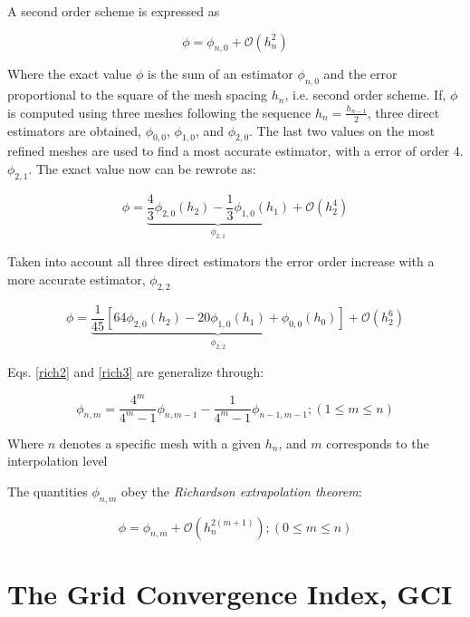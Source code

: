 A second order scheme is expressed as

\begin{equation}
    \phi=\phi_{n,0}+\mathcal{O}(h_n^2)
\end{equation}

Where the exact value $\phi$ is the sum of an estimator $\phi_{n,0}$ and the error proportional to the square of the mesh spacing $h_n$, i.e. second order scheme. If, $\phi$ is computed using three meshes following the sequence $h_n=\frac{h_{n-1}}{2}$, three direct estimators are obtained, $\phi_{0,0}$, $\phi_{1,0}$, and $\phi_{2,0}$. The last two values on the most refined meshes are used to find a most accurate estimator, with a error of order 4. $\phi_{2,1}$. The exact value now can be rewrote as:    

\begin{equation}
    \phi=\underbrace{\frac{4}{3}\phi_{2,0}(h_2)-\frac{1}{3}\phi_{1,0}(h_1)}_{\phi_{2,1}}+\mathcal{O}(h_2^4)
    \label{rich2}
\end{equation}

Taken into account all three direct estimators the error order increase with a more accurate estimator, $\phi_{2,2}$  

\begin{equation}
    \phi=\underbrace{\frac{1}{45} \left[64\phi_{2,0}(h_2)-20\phi_{1,0}(h_1)+\phi_{0,0}(h_0)\right]}_{\phi_{2,2}}+\mathcal{O}(h_2^6)
    \label{rich3}
\end{equation}

Eqs. \ref{rich2} and \ref{rich3} are generalize through:

\begin{equation}
    \phi_{n,m}=\frac{4^m}{4^m-1}\phi_{n,m-1}-\frac{1}{4^m-1}\phi_{n-1,m-1};  (1\leq m\leq n)
    \label{rich4}
\end{equation}

Where $n$ denotes a specific mesh with a given $h_n$, and $m$ corresponds to the interpolation level  

The quantities $\phi_{n,m}$ obey the \textit{Richardson extrapolation theorem}:

\begin{equation}
    \phi=\phi_{n,m}+\mathcal{O}(h_n^{2(m+1)});  (0\leq m\leq n)
\end{equation}



\section{The Grid Convergence Index, GCI}


